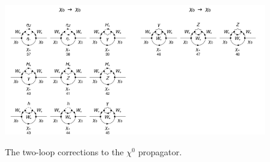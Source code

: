 \documentclass[11pt]{article}
\begin{document}
\begin{figure}[h!]
\includegraphics[width=0.5\textwidth]{diagrams_F[2]_2_5.pdf}\includegraphics[width=0.5\textwidth]{diagrams_F[2]_2_6.pdf}
\caption{The two-loop corrections to the $\chi^0$ propagator.}\label{fig:chi0chi0}
\end{figure}
\end{document}
